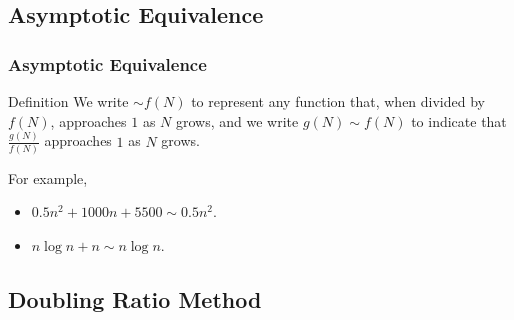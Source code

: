\documentclass{beamer}
\begin{document}
\subsection{Asymptotic Equivalence}


\begin{frame}%
\frametitle{Asymptotic Equivalence}

\begin{block}{Definition}
We write $\sim f(N)$ to represent any function that, when divided by $f(N)$,
approaches $1$ as $N$ grows, and we write
$g(N) \sim f(N)$ to indicate that $\frac{g(N)}{f(N)}$
approaches $1$ as $N$ grows.
\end{block}


\vspace{0.5cm}

For example,
\begin{itemize}
\item<2-> $0.5n^2 + 1000n + 5500 \sim 0.5n^2$.
\item<2-> $n\log n + n \sim n \log n$.
\end{itemize}

\end{frame}

\subsection{Doubling Ratio Method}
\end{document}
